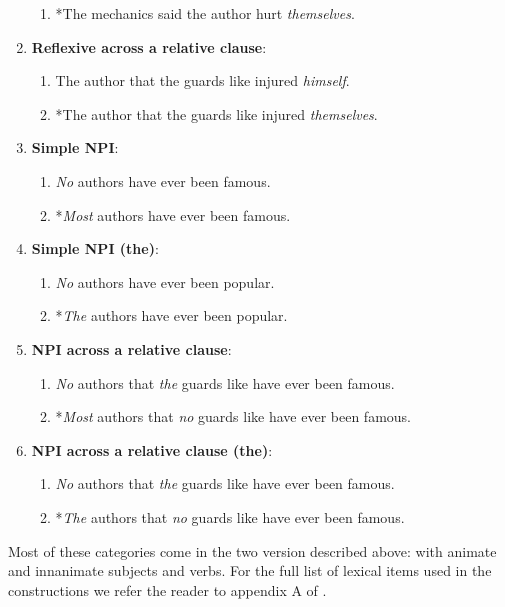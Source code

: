 \begin{enumerate}[noitemsep]
\begin{enumerate}
      \item *The mechanics said the author hurt \textit{themselves}.
    \end{enumerate}
  \item \textbf{Reflexive across a relative clause}:
    \begin{enumerate}
      \item The author that the guards like injured \textit{himself}.
      \item *The author that the guards like injured \textit{themselves}.
    \end{enumerate}
  \item \textbf{Simple NPI}:
    \begin{enumerate}
      \item \textit{No} authors have ever been famous.
      \item *\textit{Most} authors have ever been famous.
    \end{enumerate}
  \item \textbf{Simple NPI (the)}:
    \begin{enumerate}
      \item \textit{No} authors have ever been popular.
      \item *\textit{The} authors have ever been popular.
    \end{enumerate}
  \item \textbf{NPI across a relative clause}:
    \begin{enumerate}
      \item \textit{No} authors that \textit{the} guards like have ever been famous.
      \item *\textit{Most} authors that \textit{no} guards like have ever been famous.
    \end{enumerate}
  \item \textbf{NPI across a relative clause (the)}:
    \begin{enumerate}
      \item \textit{No} authors that \textit{the} guards like have ever been famous.
      \item *\textit{The} authors that \textit{no} guards like have ever been famous.
    \end{enumerate}
\end{enumerate}
Most of these categories come in the two version described above: with animate and innanimate subjects and verbs. For the full list of lexical items used in the constructions we refer the reader to appendix A of \citet{linzen2018targeted}.

